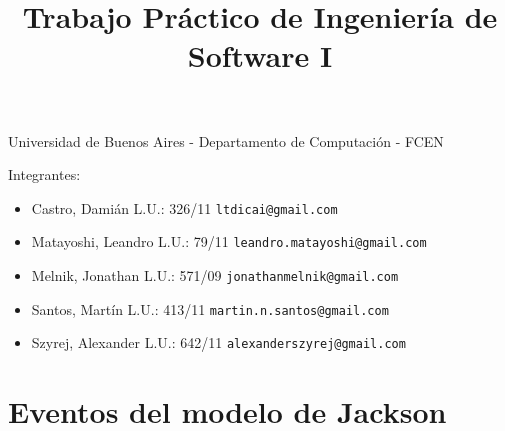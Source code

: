 \documentclass[a4paper,11pt]{article}
\title{Trabajo Práctico de Ingeniería de Software I}
\begin{document}
\maketitle

\begin{center}
	Universidad de Buenos Aires - Departamento de Computaci\'on - FCEN
\end{center}

\vspace{2cm}
Integrantes:

\begin{itemize}
	\item Castro, Dami\'an L.U.: 326/11  \verb+ltdicai@gmail.com+
	\item Matayoshi, Leandro L.U.: 79/11 \verb+leandro.matayoshi@gmail.com+
	\item Melnik, Jonathan L.U.: 571/09 \verb+jonathanmelnik@gmail.com+
	\item Santos, Martín L.U.: 413/11 \verb+martin.n.santos@gmail.com+
	\item Szyrej, Alexander L.U.: 642/11   \verb+alexanderszyrej@gmail.com+
	
\end{itemize}

\newpage

\tableofcontents

\newpage

\section{Eventos del modelo de Jackson}


\end{document}
